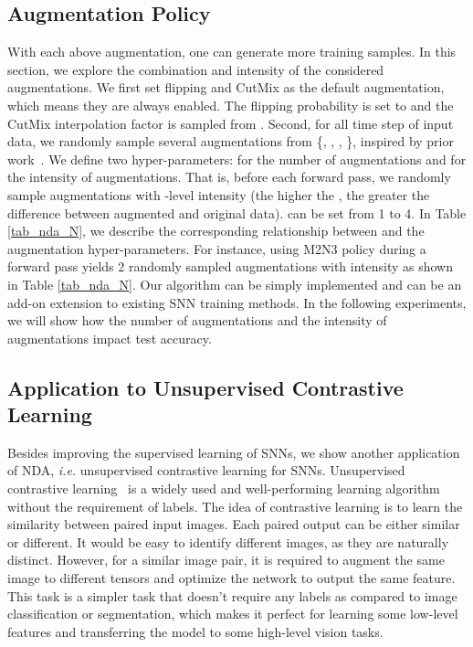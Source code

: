 \documentclass[runningheads]{llncs}
\begin{document}
\subsection{Augmentation Policy}
With each above augmentation, one can generate more training samples. 
In this section, we explore the combination and intensity of the considered augmentations.
We first set flipping and CutMix as the default augmentation, which means they are always enabled. The flipping probability is set to  and the CutMix interpolation factor is sampled from . 
Second, for all time step of input data, we randomly sample several augmentations from \{, , , \}, inspired by prior work~\cite{cubuk2020randaugment,munoz2017deep,zhong2020random}. We define two hyper-parameters:  for the number of augmentations and  for the intensity of augmentations. That is, before each forward pass, we randomly sample  augmentations with -level intensity (the higher the , the greater the difference between augmented and original data).  can be set from 1 to 4. In Table \ref{tab_nda_N}, we describe the corresponding relationship between  and the augmentation hyper-parameters. For instance, using M2N3 policy during a forward pass yields 2 randomly sampled augmentations with  intensity as shown in Table \ref{tab_nda_N}. Our algorithm can be simply implemented and can be an add-on extension to existing SNN training methods. 
In the following experiments, we will show how the number of augmentations and the intensity of augmentations impact test accuracy.



\subsection{Application to Unsupervised Contrastive Learning}
Besides improving the supervised learning of SNNs, we show another application of NDA, \textit{i.e.} unsupervised contrastive learning for SNNs.  
Unsupervised contrastive learning~\cite{he2020momentum,chen2020simple,chen2020improved,grill2020bootstrap} is a widely used and well-performing learning algorithm without the requirement of labels.
The idea of contrastive learning is to learn the similarity between paired input images. Each paired output can be either similar or different. 
It would be easy to identify different images, as they are naturally distinct. However, for a  similar image pair, it is required to {augment the same image to different tensors and optimize the network to output the same feature}.  
This task is a simpler task that doesn't require any labels as compared to image classification or segmentation, which makes it perfect for learning some low-level features and transferring the model to some high-level vision tasks. 
\end{document}
